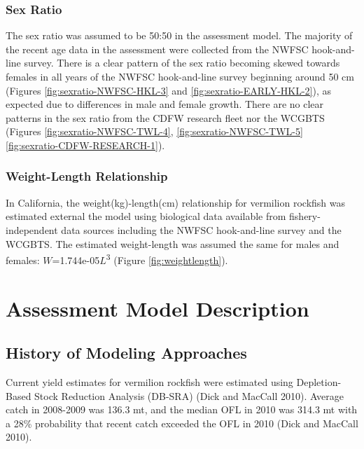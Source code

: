 \documentclass[
  english,
  a4paper,
]{article}
\begin{document}
\hypertarget{sex-ratio}{%
\subsubsection{Sex Ratio}\label{sex-ratio}}

The sex ratio was assumed to be 50:50 in the assessment model. The majority of the recent age data in the assessment were collected from the NWFSC hook-and-line survey. There is a clear pattern of the sex ratio becoming skewed towards females in all years of the NWFSC hook-and-line survey beginning around 50 cm (Figures \ref{fig:sexratio-NWFSC-HKL-3} and \ref{fig:sexratio-EARLY-HKL-2}), as expected due to differences in male and female growth. There are no clear patterns in the sex ratio from the CDFW research fleet nor the WCGBTS (Figures \ref{fig:sexratio-NWFSC-TWL-4}, \ref{fig:sexratio-NWFSC-TWL-5} \ref{fig:sexratio-CDFW-RESEARCH-1}).

\hypertarget{weight-length-relationship}{%
\subsubsection{Weight-Length Relationship}\label{weight-length-relationship}}

In California, the weight(kg)-length(cm) relationship for vermilion rockfish was estimated external the
model using biological data available from fishery-independent
data sources including the NWFSC hook-and-line survey and the WCGBTS. The estimated
weight-length was assumed the same for males and females:
\(W\)=1.744e-05\(L\)\textsuperscript{3}
(Figure \ref{fig:weightlength}).

\hypertarget{assessment-model-description}{%
\section{Assessment Model Description}\label{assessment-model-description}}

\hypertarget{history-of-modeling-approaches}{%
\subsection{History of Modeling Approaches}\label{history-of-modeling-approaches}}

Current yield estimates for vermilion rockfish were estimated using
Depletion-Based Stock Reduction Analysis (DB-SRA) (Dick and MacCall 2010). Average catch
in 2008-2009 was 136.3 mt, and the median OFL in 2010 was 314.3 mt with a 28\%
probability that recent catch exceeded the OFL in 2010 (Dick and MacCall 2010).
\end{document}
